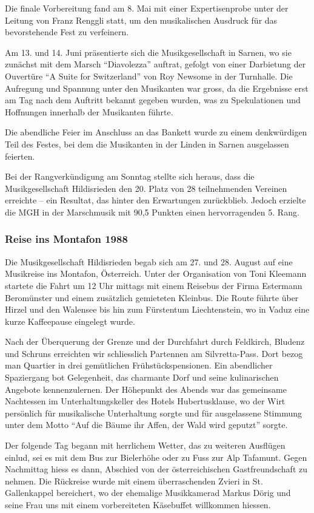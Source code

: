 \begin{history}
    Die finale Vorbereitung fand am 8. Mai mit einer Expertisenprobe unter der
    Leitung von Franz Renggli statt, um den musikalischen Ausdruck für das
    bevorstehende Fest zu verfeinern.

    Am 13. und 14. Juni präsentierte sich die Musikgesellschaft in Sarnen, wo
    sie zunächst mit dem Marsch \enquote{Diavolezza} auftrat, gefolgt von einer
    Darbietung der Ouvertüre \enquote{A Suite for Switzerland} von Roy Newsome
    in der Turnhalle. Die Aufregung und Spannung unter den Musikanten war gross,
    da die Ergebnisse erst am Tag nach dem Auftritt bekannt gegeben wurden, was
    zu Spekulationen und Hoffnungen innerhalb der Musikanten führte.

    Die abendliche Feier im Anschluss an das Bankett wurde zu einem denkwürdigen
    Teil des Festes, bei dem die Musikanten in der Linden in Sarnen ausgelassen
    feierten.

    Bei der Rangverkündigung am Sonntag stellte sich heraus, dass die
    Musikgesellschaft Hildisrieden den 20. Platz von 28 teilnehmenden Vereinen
    erreichte -- ein Resultat, das hinter den Erwartungen zurückblieb. Jedoch
    erzielte die MGH in der Marschmusik mit 90,5 Punkten einen hervorragenden 5.
    Rang.

    \subsubsection{Reise ins Montafon 1988}

    Die Musikgesellschaft Hildisrieden begab sich am 27. und 28. August auf eine
    Musikreise ins Montafon, Österreich. Unter der Organisation von Toni
    Kleemann startete die Fahrt um 12 Uhr mittags mit einem Reisebus der Firma
    Estermann Beromünster und einem zusätzlich gemieteten Kleinbus. Die Route
    führte über Hirzel und den Walensee bis hin zum Fürstentum Liechtenstein, wo
    in Vaduz eine kurze Kaffeepause eingelegt wurde.

    Nach der Überquerung der Grenze und der Durchfahrt durch Feldkirch, Bludenz
    und Schruns erreichten wir schliesslich Partennen am Silvretta-Pass. Dort
    bezog man Quartier in drei gemütlichen Frühstückspensionen. Ein abendlicher
    Spaziergang bot Gelegenheit, das charmante Dorf und seine kulinarischen
    Angebote kennenzulernen. Der Höhepunkt des Abends war das gemeinsame
    Nachtessen im Unterhaltungskeller des Hotels Hubertusklause, wo der Wirt
    persönlich für musikalische Unterhaltung sorgte und für ausgelassene
    Stimmung unter dem Motto \enquote{Auf die Bäume ihr Affen, der Wald wird
        geputzt} sorgte.

    Der folgende Tag begann mit herrlichem Wetter, das zu weiteren Ausflügen
    einlud, sei es mit dem Bus zur Bielerhöhe oder zu Fuss zur Alp Tafamunt.
    Gegen Nachmittag hiess es dann, Abschied von der österreichischen
    Gastfreundschaft zu nehmen. Die Rückreise wurde mit einem überraschenden
    Zvieri in St. Gallenkappel bereichert, wo der ehemalige Musikkamerad Markus
    Dörig und seine Frau uns mit einem vorbereiteten Käsebuffet willkommen
    hiessen.

\end{history}

